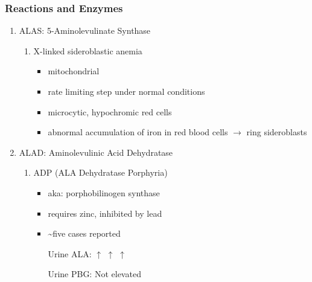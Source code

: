 \documentclass{scrartcl}
\begin{document}
\subsubsection{Reactions and Enzymes}
\label{sec:org02c64b9}
\begin{enumerate}
\item ALAS: 5-Aminolevulinate Synthase
\label{sec:orgc48f589}
\begin{enumerate}
\item X-linked sideroblastic anemia
\label{sec:orge7eb199}
\begin{itemize}
\item mitochondrial
\item rate limiting step under normal conditions
\item microcytic, hypochromic red cells
\item abnormal accumulation of iron in red blood cells \(\to\) ring
sideroblasts
\end{itemize}
\end{enumerate}

\item ALAD: Aminolevulinic Acid Dehydratase
\label{sec:orgdf24244}
\begin{enumerate}
\item ADP (ALA Dehydratase Porphyria)
\label{sec:orgc50e7c9}
\begin{itemize}
\item aka: porphobilinogen synthase
\item requires zinc, inhibited by lead
\item \textasciitilde{}five cases reported
\item[{Urine ALA:}] \(\uparrow\) \(\uparrow\) \(\uparrow\)
\item[{Urine PBG:}] Not elevated
\end{itemize}
\end{enumerate}


\end{enumerate}
\end{document}
